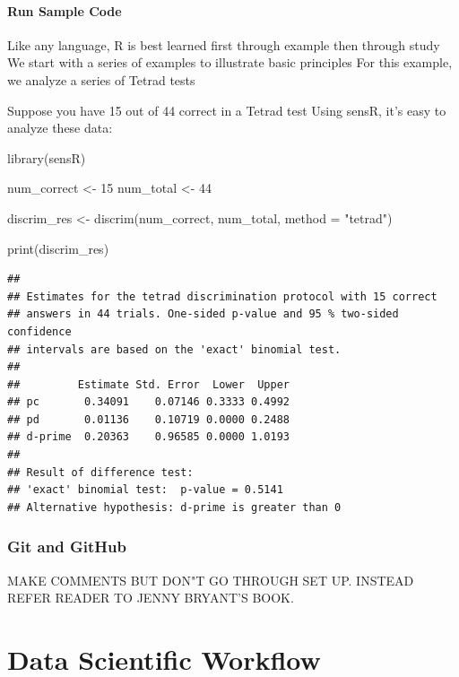 \documentclass[
]{book}
\newenvironment{Shaded}{\begin{snugshade}}{\end{snugshade}}
\newcommand{\AttributeTok}[1]{\textcolor[rgb]{0.77,0.63,0.00}{#1}}
\newcommand{\DecValTok}[1]{\textcolor[rgb]{0.00,0.00,0.81}{#1}}
\newcommand{\FunctionTok}[1]{\textcolor[rgb]{0.00,0.00,0.00}{#1}}
\newcommand{\NormalTok}[1]{#1}
\newcommand{\OtherTok}[1]{\textcolor[rgb]{0.56,0.35,0.01}{#1}}
\newcommand{\StringTok}[1]{\textcolor[rgb]{0.31,0.60,0.02}{#1}}
\begin{document}
\hypertarget{run-sample-code}{%
\subsection{Run Sample Code}\label{run-sample-code}}

Like any language, R is best learned first through example then through study
We start with a series of examples to illustrate basic principles
For this example, we analyze a series of Tetrad tests

Suppose you have 15 out of 44 correct in a Tetrad test
Using sensR, it's easy to analyze these data:

\begin{Shaded}
\begin{Highlighting}[]
\FunctionTok{library}\NormalTok{(sensR)}

\NormalTok{num\_correct }\OtherTok{\textless{}{-}} \DecValTok{15}  
\NormalTok{num\_total }\OtherTok{\textless{}{-}} \DecValTok{44}  
  
\NormalTok{discrim\_res }\OtherTok{\textless{}{-}} \FunctionTok{discrim}\NormalTok{(num\_correct, num\_total, }\AttributeTok{method =} \StringTok{"tetrad"}\NormalTok{)  }
  
\FunctionTok{print}\NormalTok{(discrim\_res)  }
\end{Highlighting}
\end{Shaded}

\begin{verbatim}
## 
## Estimates for the tetrad discrimination protocol with 15 correct
## answers in 44 trials. One-sided p-value and 95 % two-sided confidence
## intervals are based on the 'exact' binomial test. 
## 
##         Estimate Std. Error  Lower  Upper
## pc       0.34091    0.07146 0.3333 0.4992
## pd       0.01136    0.10719 0.0000 0.2488
## d-prime  0.20363    0.96585 0.0000 1.0193
## 
## Result of difference test:
## 'exact' binomial test:  p-value = 0.5141 
## Alternative hypothesis: d-prime is greater than 0
\end{verbatim}

\hypertarget{git-and-github}{%
\section{Git and GitHub}\label{git-and-github}}

MAKE COMMENTS BUT DON"T GO THROUGH SET UP. INSTEAD REFER READER TO JENNY BRYANT'S BOOK.

\hypertarget{part-data-scientific-workflow}{%
\part*{Data Scientific Workflow}\label{part-data-scientific-workflow}}
\end{document}

